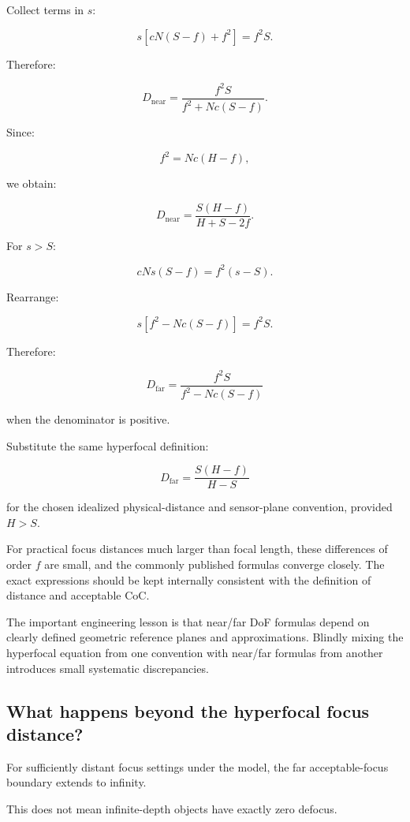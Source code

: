 Collect terms in \(s\):

\[ s[cN(S-f)+f^2]=f^2S. \]

Therefore:

\[ \boxed{ D_{\mathrm{near}} = \frac{f^2S}{f^2+Nc(S-f)}. } \]

Since:

\[ f^2=Nc(H-f), \]

we obtain:

\[ \boxed{ D_{\mathrm{near}} = \frac{S(H-f)}{H+S-2f}. } \]

For \(s>S\):

\[ cNs(S-f)=f^2(s-S). \]

Rearrange:

\[ s[f^2-Nc(S-f)]=f^2S. \]

Therefore:

\[ \boxed{ D_{\mathrm{far}} = \frac{f^2S}{f^2-Nc(S-f)} } \]

when the denominator is positive.

Substitute the same hyperfocal definition:

\[ \boxed{ D_{\mathrm{far}} = \frac{S(H-f)}{H-S} } \]

for the chosen idealized physical-distance and sensor-plane convention, provided \(H>S\).

For practical focus distances much larger than focal length, these differences of order \(f\) are small, and the commonly published formulas converge closely. The exact expressions should be kept internally consistent with the definition of distance and acceptable CoC.

The important engineering lesson is that near/far DoF formulas depend on clearly defined geometric reference planes and approximations. Blindly mixing the hyperfocal equation from one convention with near/far formulas from another introduces small systematic discrepancies.

\subsection{What happens beyond the hyperfocal focus distance?}\label{02-foundations-ii-ch036-what-happens-beyond-the-hyperfocal-focus-distance}

\hypertarget{02-foundations-ii-ch036-what-happens-beyond-the-hyperfocal-focus-distance}{}

For sufficiently distant focus settings under the model, the far acceptable-focus boundary extends to infinity.

This does not mean infinite-depth objects have exactly zero defocus.

